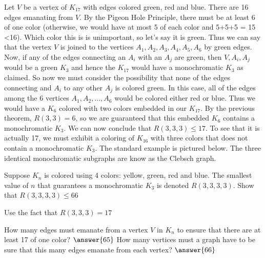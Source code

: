 \documentclass[handout]{ximera}
\begin{document}
\begin{theorem}[$R(3,3,3) = 17$]
Let $V$ be a vertex of $K_{17}$ with edges colored green, red and blue. There are 16 edges emanating from $V$.
By the Pigeon Hole Principle, there must be at least 6 of one color (otherwise, we would have at most 5 of each color
and 5+5+5 = 15 <16).  Which color this is is unimportant, so let's say it is green. Thus we can say that the vertex $V$ is 
joined to the vertices $A_1, A_2, A_3, A_4, A_5, A_6$ by green edges. Now, if any of the edges connecting an $A_i$
with an $A_j$ are green, then $V, A_i, A_j$ would be a green $K_3$ and hence the $K_{17}$ would have a monochromatic 
$K_3$ as claimed. So now we must consider the possibility that none of the edges connecting and $A_i$ to any other $A_j$
is colored green.  In this case, all of the edges among the 6 vertices $A_1, A_2, ..., A_6$ would be 
colored either red or blue.  Thus we would have a $K_6$ colored with two colors embedded in our $K_{17}$.  
By the previous theorem, $R(3,3) = 6$, so we are guaranteed that this embedded $K_6$ contains a monochromatic $K_3$.
We can now conclude that $R(3,3,3) \leq 17$. To see that it is actually 17, we must exhibit a coloring of $K_16$ with three 
colors that does not contain  a monochromatic $K_3$.  
The standard example is pictured below. The three identical monochromatic subgraphs are know as the Clebsch graph.


\end{theorem}

\begin{problem}
Suppose $K_n$ is colored using 4 colors: yellow, green, red and blue. The smallest value of $n$ that guarantees
a monochromatic $K_3$ is denoted $R(3,3,3,3)$. Show that $R(3,3,3,3) \leq 66$
\begin{hint}
Use the fact that $R(3,3,3) = 17$
\end{hint}
How many edges must emanate from a vertex $V$ in $K_n$ to ensure that there are at least 17 of one color? $\answer{65}$
How many vertices must a graph have to be sure that this many edges emanate from each vertex? $\answer{66}$

\end{problem}
\end{document}
